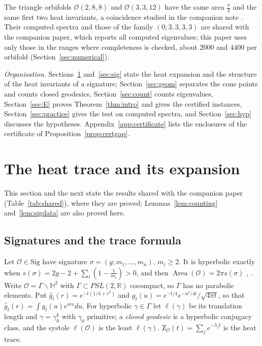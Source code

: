 \documentclass[pdflatex,sn-mathphys-num]{sn-jnl}
\theoremstyle{thmstyleone}%
\theoremstyle{thmstylethree}%
\newcommand{\Orb}{\mathcal{O}}
\newcommand{\Sig}{\mathrm{Sig}}
\newcommand{\Area}{\operatorname{Area}}
\newcommand{\R}{\mathbb{R}}
\newcommand{\cZ}{\mathrm{Z}}
\newcommand{\Hb}{\mathbb{H}^2}
\begin{document}
The triangle orbifolds $\Orb(2,8,8)$ and $\Orb(3,3,12)$ have the same area $\frac\pi2$ and the same first two heat invariants, a coincidence studied in the companion note \cite{companionN}. Their computed spectra and those of the family $(0;3,3,3,3)$ are shared with the companion paper, which reports all computed eigenvalues; this paper uses only those in the ranges where completeness is checked, about $2000$ and $4400$ per orbifold (Section~\ref{sec:numerical}).

\emph{Organisation.} Sections~\ref{sec:heat} and~\ref{sec:sig} state the heat expansion and the structure of the heat invariants of a signature; Section~\ref{sec:geom} separates the cone points and counts closed geodesics, Section~\ref{sec:count} counts eigenvalues, Section~\ref{sec:E} proves Theorem~\ref{thm:intro} and gives the certified instances, Section~\ref{sec:practice} gives the test on computed spectra, and Section~\ref{sec:hyp} discusses the hypotheses. Appendix~\ref{app:certificate} lists the enclosures of the certificate of Proposition~\ref{prop:certgap}.

\section{The heat trace and its expansion}\label{sec:heat}

This section and the next state the results shared with the companion paper (Table~\ref{tab:shared}), where they are proved; Lemmas~\ref{lem:counting} and~\ref{lem:sigdata} are also proved here.

\subsection{Signatures and the trace formula}

Let $\Orb\in\Sig$ have signature $\sigma=(g;m_1,\dots,m_n)$, $m_i\ge2$. It is hyperbolic exactly when $s(\sigma)=2g-2+\sum_i(1-\frac1{m_i})>0$, and then $\Area(\Orb)=2\pi s(\sigma)$ \cite[13.3.4--13.3.6]{thurston1980}, \cite[Thm~3.2]{drydenstrohmaier2009}. Write $\Orb=\Gamma\backslash\Hb$ with $\Gamma\subset PSL(2,\R)$ cocompact, so $\Gamma$ has no parabolic elements. Put $\hat g_t(r)=e^{-t(1/4+r^2)}$ and $g_t(u)=e^{-t/4}e^{-u^2/4t}/\sqrt{4\pi t}$, so that $\hat g_t(r)=\int g_t(u)e^{iru}du$. For hyperbolic $\gamma\in\Gamma$ let $\ell(\gamma)$ be its translation length and $\gamma=\gamma_0^k$ with $\gamma_0$ primitive; a \emph{closed geodesic} is a hyperbolic conjugacy class, and the systole $\ell(\Orb)$ is the least $\ell(\gamma)$. $\cZ_\Orb(t)=\sum_je^{-\lambda_jt}$ is the heat trace.
\end{document}
